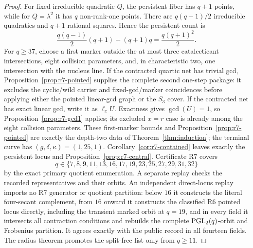 \begin{proof}
For fixed irreducible quadratic \(Q\), the persistent fiber has
\(q+1\) points, while for \(Q=\lambda^2\) it has \(q\) non-rank-one
points.  There are \(q(q-1)/2\) irreducible quadratics and \(q+1\)
rational squares.  Hence the persistent count is
\[
 \frac{q(q-1)}2(q+1)+(q+1)q=\frac{q(q+1)^2}{2}.
\]
For \(q\geq37\), choose a first marker outside the at most three
catalecticant intersections, eight collision parameters, and, in
characteristic two, one intersection with the nucleus line.  If the
contracted quartic net has trivial gcd,
Proposition~\ref{prop:r7-pointed} supplies the complete second
one-step package: it excludes the cyclic/wild carrier and
fixed-gcd/marker coincidences before applying either the pointed
linear-gcd graph or the \(S_3\) cover.  If the contracted net has exact
linear gcd, write it as \(\ell_xU\).  Exactness gives
\(\gcd(U)=1\), so Proposition~\ref{prop:r7-gcd1} applies; its excluded
\(x=r\) case is already among the eight collision parameters.
These first-marker bounds and Proposition~\ref{prop:r7-pointed} are
exactly the depth-two data of Theorem~\ref{thm:induction}; the terminal
curve has \((g,\delta,\kappa)=(1,25,1)\).
Corollary~\ref{cor:r7-contained} leaves exactly the persistent locus and
Proposition~\ref{prop:r7-central}.  Certificate R7 covers
\[
q\in\{7,8,9,11,13,16,17,19,23,25,27,29,31,32\}
\]
by the exact primary quotient enumeration.  A separate replay checks the
recorded representatives and their orbits.  An independent direct-locus
replay imports no R7 generator or quotient partition: below \(16\) it
constructs the literal four-secant complement, from \(16\) onward it
constructs the classified R6 pointed locus directly, including the
transient marked orbit at \(q=19\), and in every field it intersects all
contraction conditions and rebuilds the complete
\(\operatorname{PGL}_2(q)\)-orbit and Frobenius partition.  It agrees exactly with the
public record in all fourteen fields.  The radius theorem promotes the
split-free list only from $q\geq11$.
\end{proof}

